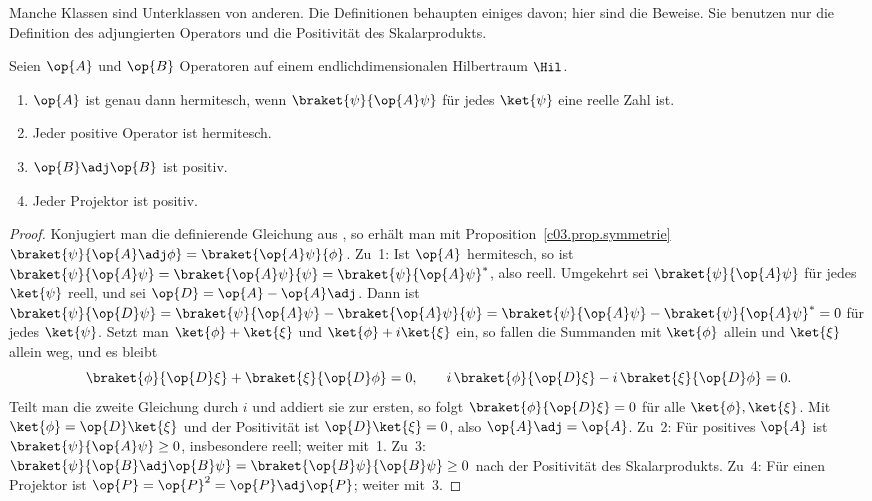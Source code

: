 Manche Klassen sind Unterklassen von anderen. Die Definitionen behaupten einiges davon; hier sind
die Beweise. Sie benutzen nur die Definition des adjungierten Operators und die Positivität des
Skalarprodukts.

\begin{proposition}\label{c03.prop.positiv}
  Seien $\op{A}$ und $\op{B}$ Operatoren auf einem endlichdimensionalen Hilbertraum $\Hil$.
  \begin{enumerate}
    \item $\op{A}$ ist genau dann hermitesch, wenn $\braket{\psi}{\op{A}\psi}$ für jedes
      $\ket{\psi}$ eine reelle Zahl ist.
    \item Jeder positive Operator ist hermitesch.
    \item $\op{B}\adj\op{B}$ ist positiv.
    \item Jeder Projektor ist positiv.
  \end{enumerate}
\end{proposition}
\begin{proof}
  Konjugiert man die definierende Gleichung aus , so erhält man mit
  Proposition~\ref{c03.prop.symmetrie} $\braket{\psi}{\op{A}\adj\phi} = \braket{\op{A}\psi}{\phi}$.
  Zu~1: Ist $\op{A}$ hermitesch, so ist
  $\braket{\psi}{\op{A}\psi} = \braket{\op{A}\psi}{\psi} = \braket{\psi}{\op{A}\psi}^*$, also
  reell. Umgekehrt sei $\braket{\psi}{\op{A}\psi}$ für jedes $\ket{\psi}$ reell, und sei
  $\op{D} = \op{A} - \op{A}\adj$. Dann ist
  $\braket{\psi}{\op{D}\psi} = \braket{\psi}{\op{A}\psi} - \braket{\op{A}\psi}{\psi} = \braket{\psi}{\op{A}\psi} - \braket{\psi}{\op{A}\psi}^* = 0$
  für jedes $\ket{\psi}$. Setzt man $\ket{\phi} + \ket{\xi}$ und $\ket{\phi} + i\ket{\xi}$
  ein, so fallen die Summanden mit $\ket{\phi}$ allein und $\ket{\xi}$ allein weg, und es
  bleibt
  \begin{equation}\label{c03.eq.polarisation}
    \braket{\phi}{\op{D}\xi} + \braket{\xi}{\op{D}\phi} = 0 ,
    \qquad
    i\, \braket{\phi}{\op{D}\xi} - i\, \braket{\xi}{\op{D}\phi} = 0 .
  \end{equation}
  Teilt man die zweite Gleichung durch $i$ und addiert sie zur ersten, so folgt
  $\braket{\phi}{\op{D}\xi} = 0$ für alle $\ket{\phi}, \ket{\xi}$. Mit
  $\ket{\phi} = \op{D}\ket{\xi}$ und der Positivität ist $\op{D}\ket{\xi} = 0$, also
  $\op{A}\adj = \op{A}$. Zu~2: Für positives $\op{A}$ ist $\braket{\psi}{\op{A}\psi} \geq 0$,
  insbesondere reell; weiter mit~1. Zu~3:
  $\braket{\psi}{\op{B}\adj\op{B}\psi} = \braket{\op{B}\psi}{\op{B}\psi} \geq 0$ nach der
  Positivität des Skalarprodukts. Zu~4: Für einen Projektor ist
  $\op{P} = \op{P}^2 = \op{P}\adj\op{P}$; weiter mit~3.
\end{proof}

